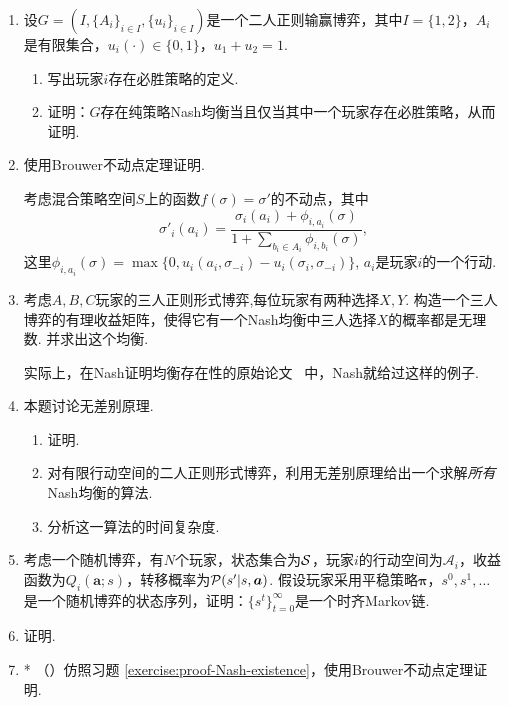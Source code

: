 \begin{enumerate}[wide, labelindent=0pt]
    \item \label{exercise:zero-sum-pure-NE} 设$G=(I,\{A_i\}_{i\in I}, \{u_i\}_{i\in I})$是一个二人正则输赢博弈，其中$I=\{1,2\}$，$A_i$是有限集合，$u_i(\cdot)\in\{0,1\}$，$u_1+u_2=1$.
    \begin{enumerate}
        \item 写出玩家$i$存在必胜策略的定义.
        \item 证明：$G$存在纯策略Nash均衡当且仅当其中一个玩家存在必胜策略，从而证明.
    \end{enumerate}

    \item \label{exercise:proof-Nash-existence} 使用Brouwer不动点定理证明.
        \begin{hint}
        考虑混合策略空间$S$上的函数$f(\sigma) = \sigma'$的不动点，其中
        \[\sigma'_i(a_i) = \frac{\sigma_i(a_i) + \phi_{i,a_i}(\sigma)}{1+\sum_{b_i\in A_i}\phi_{i,b_i}(\sigma)},\]
        这里$\phi_{i,a_i}(\sigma)=\max\{0, u_i(a_i,\sigma_{-i})-u_i(\sigma_i,\sigma_{-i})\}$, $a_i$是玩家$i$的一个行动. 
        \end{hint}
    
    \item 考虑$A,B,C$玩家的三人正则形式博弈,每位玩家有两种选择$X,Y$. 构造一个三人博弈的有理收益矩阵，使得它有一个Nash均衡中三人选择$X$的概率都是无理数. 并求出这个均衡.
    \begin{hint}
        实际上，在Nash证明均衡存在性的原始论文~\cite{nashNonCooperativeGames1951} 中，Nash就给过这样的例子.
    \end{hint}

    \item \label{exercise:indifference-principle} 本题讨论无差别原理. 
    \begin{enumerate}
        \item 证明.
        \item 对有限行动空间的二人正则形式博弈，利用无差别原理给出一个求解\textit{所有}Nash均衡的算法. 
        \item 分析这一算法的时间复杂度.
    \end{enumerate}

    \item \label{exercise:state-sequence-Markov} 考虑一个随机博弈，有$N$个玩家，状态集合为$\mathcal S$，玩家$i$的行动空间为$\mathcal A_i$，收益函数为$Q_i(\boldsymbol a;s)$，转移概率为$\mathcal P(s'|s,\boldsymbol a)$. 假设玩家采用平稳策略$\boldsymbol \pi$，$s^0,s^1,\dots$是一个随机博弈的状态序列，证明：$\{s^t\}_{t=0}^{\infty}$是一个时齐Markov链. 
    
    \item \label{exercise:stochastic-game-bellman} 证明.
    
    \item *\label{exercise:proof-MPE-existence} （\cite{dengComplexityComputingMarkov2023}）仿照习题 \ref{exercise:proof-Nash-existence}，使用Brouwer不动点定理证明.
\end{enumerate}